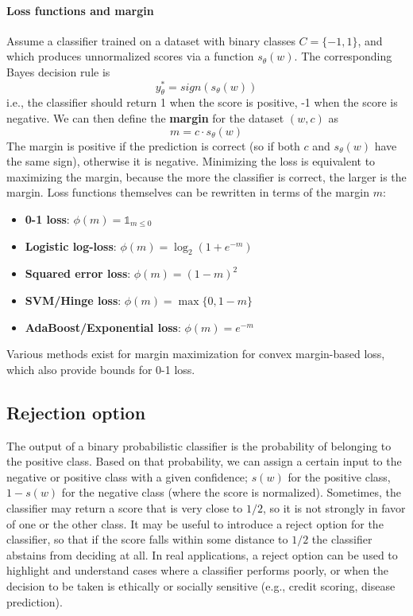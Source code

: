 \paragraph{Loss functions and margin}

Assume a classifier trained on a dataset with binary classes $C = \{-1,1\}$, and which produces unnormalized scores via a function $s_{\theta}(w)$. The corresponding Bayes decision rule is
\begin{equation*}
    y_{\theta}^* = \textit{sign}(s_{\theta}(w))
\end{equation*}
i.e., the classifier should return 1 when the score is positive, -1 when the score is negative. We can then define the \textbf{margin} for the dataset $(w,c)$ as
\begin{equation*}
    m = c \cdot s_{\theta}(w)
\end{equation*}
The margin is positive if the prediction is correct (so if both $c$ and $s_{\theta}(w)$ have the same sign), otherwise it is negative. Minimizing the loss is equivalent to maximizing the margin, because the more the classifier is correct, the larger is the margin. Loss functions themselves can be rewritten in terms of the margin $m$:
\begin{itemize}[noitemsep]
    \item \textbf{0-1 loss}: $\phi(m) = \mathds{1}_{m \leq 0}$
    \item \textbf{Logistic log-loss}: $\phi(m) = \log_2 (1 + e^{-m})$
    \item \textbf{Squared error loss}: $\phi(m) = (1 - m)^2$
    \item \textbf{SVM/Hinge loss}: $\phi(m) = \max\{0, 1 - m\}$
    \item \textbf{AdaBoost/Exponential loss}: $\phi(m) = e^{-m}$
\end{itemize}
Various methods exist for margin maximization for convex margin-based loss, which also provide bounds for 0-1 loss.

\subsection{Rejection option}

The output of a binary probabilistic classifier is the probability of belonging to the positive class. Based on that probability, we can assign a certain input to the negative or positive class with a given confidence; $s(w)$ for the positive class, $1-s(w)$ for the negative class (where the score is normalized). Sometimes, the classifier may return a score that is very close to $1/2$, so it is not strongly in favor of one or the other class. It may be useful to introduce a reject option for the classifier, so that if the score falls within some distance to $1/2$ the classifier abstains from deciding at all. In real applications, a reject option can be used to highlight and understand cases where a classifier performs poorly, or when the decision to be taken is ethically or socially sensitive (e.g., credit scoring, disease prediction).

